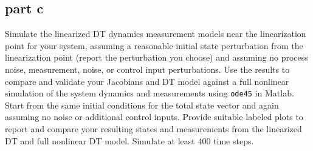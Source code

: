 \documentclass[11pt]{article}
\begin{document}
\subsection*{part c}
Simulate the linearized DT dynamics measurement models near the linearization point for your system, assuming a reasonable initial state perturbation from the linearization point (report the perturbation you choose) and assuming no process noise, measurement, noise, or control input perturbations. Use the results to compare and validate your Jacobians and DT model against a full nonlinear simulation of the system dynamics and measurements using \texttt{ode45} in Matlab. Start from the same initial conditions for the total state vector and again assuming no noise or additional control inputs. Provide suitable labeled plots to report and compare your resulting states and measurements from the linearized DT and full nonlinear DT model. Simulate at least 400 time steps.
\end{document}
